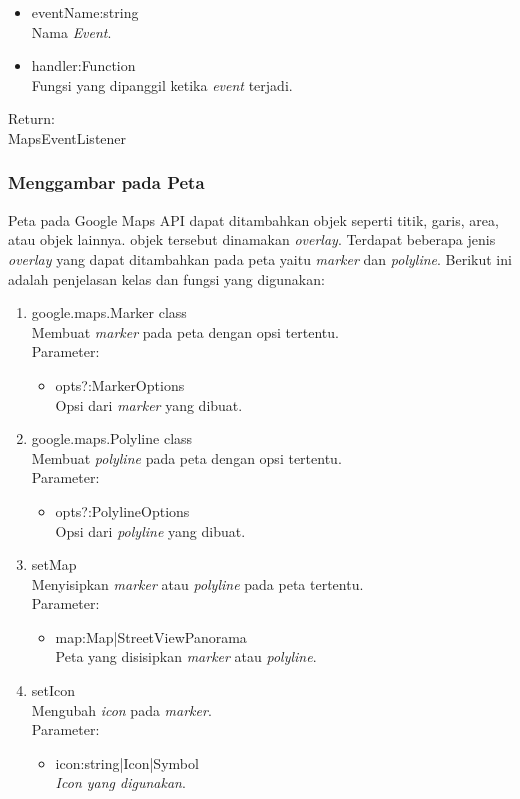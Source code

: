 \begin{enumerate}
\begin{itemize}
    \item eventName:string\\
    Nama \textit{Event}.
    
    \item handler:Function\\
    Fungsi yang dipanggil ketika \textit{event} terjadi.
  \end{itemize}
  Return:\\
  MapsEventListener
\end{enumerate}

\subsubsection{Menggambar pada Peta}
Peta pada Google Maps API dapat ditambahkan objek seperti titik, garis, area,
atau objek lainnya. objek tersebut dinamakan \textit{overlay}. Terdapat beberapa
jenis \textit{overlay} yang dapat ditambahkan pada peta yaitu \textit{marker}
dan \textit{polyline}. Berikut ini adalah penjelasan kelas dan fungsi yang
digunakan:
\begin{enumerate}
  \item google.maps.Marker class \\
  Membuat \textit{marker} pada peta dengan opsi tertentu.\\
  Parameter:
  \begin{itemize}
    \item opts?:MarkerOptions\\
    Opsi dari \textit{marker} yang dibuat.
  \end{itemize}
  
  \item google.maps.Polyline class\\
  Membuat \textit{polyline} pada peta dengan opsi tertentu.\\
  Parameter:
  \begin{itemize}
    \item opts?:PolylineOptions\\
    Opsi dari \textit{polyline} yang dibuat.
  \end{itemize}
  
  \item setMap\\
  Menyisipkan \textit{marker} atau \textit{polyline} pada peta tertentu.\\
  Parameter:
  \begin{itemize}
    \item map:Map|StreetViewPanorama\\
    Peta yang disisipkan \textit{marker} atau \textit{polyline}.
  \end{itemize}
  
  \item setIcon\\
  Mengubah \textit{icon} pada \textit{marker}.\\
  Parameter:
  \begin{itemize}
    \item icon:string|Icon|Symbol\\
    \textit{Icon yang digunakan}.
  \end{itemize}
\end{enumerate}

